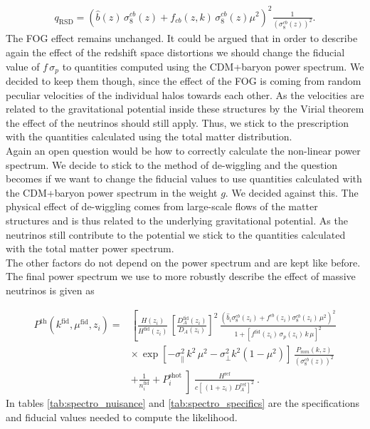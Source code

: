\documentclass[../main.tex]{subfiles}
\begin{document}
\begin{align*}
    q_\mathrm{RSD} = \left(\hat{b}(z) \,\sigma_8^{cb}(z)+f_{cb}(z,k) \,\sigma_8^{cb}(z)\mu^2\right)^2 \frac{1}{\left(\sigma_8^{cb}(z)\right)^2} .
\end{align*} 
The FOG effect remains unchanged. It could be argued that in order to describe again the effect of the redshift space distortions we should change the fiducial value of $f\,\sigma_p$ to quantities computed using the CDM+baryon power spectrum. We decided to keep them though, since the effect of the FOG is coming from random peculiar velocities of the individual halos towards each other. As the velocities are related to the gravitational potential inside these structures by the Virial theorem the effect of the neutrinos should still apply. Thus, we stick to the prescription with the quantities calculated using the total matter distribution.\\
Again an open question would be how to correctly calculate the non-linear power spectrum. We decide to stick to the method of de-wiggling and the question becomes if we want to change the fiducial values to use quantities calculated with the CDM+baryon power spectrum in the weight $g$. We decided against this. The physical effect of de-wiggling comes from large-scale flows of the matter structures and is thus related to the underlying gravitational potential. As the neutrinos still contribute to the potential we stick to the quantities calculated with the total matter power spectrum.\\
The other factors do not depend on the power spectrum and are kept like before. The final power spectrum we use to more robustly describe the effect of massive neutrinos is given as 

\begin{align}
    P^\mathrm{th}(k^\mathrm{fid},\mu^\mathrm{fid},z_i) =& \left[\frac{H(z_i)}{H^\mathrm{fid}(z_i)}\, \left[\frac{D^\mathrm{fid}_A(z_i)}{D_A(z_i)}\right]^2 \, \frac{\left(\hat{b}_i \sigma^{cb}_8(z_i) + f^{cb}(z_i) \sigma^{cb}_8(z_i) \,\mu^2 \right)^2}{1+\left[f^\mathrm{fid}(z_i)\,\sigma_p(z_i)\,k\,\mu\right]^2} \right. \nonumber\\
    &\times\,\exp\left[- \sigma_\|^2 \, k^2\,\mu^2 - \sigma_\perp^2 k^2 \left(1-\mu^2\right) \right]\, \frac{P_{mm}(k,z)}{\left(\sigma_8^{cb}(z)\right)^2}  \\
    &+ \left.\frac{1}{n_i^\mathrm{fid}} + P_i^\mathrm{shot}\middle] \frac{H^\mathrm{ref}}{c\left[ \,(1+z_i)\,D_A^\mathrm{ref}\right]^2}\right.\:.\nonumber
\end{align} 
In tables \ref{tab:spectro_nuisance} and \ref{tab:spectro_specifics} are the specifications and fiducial values needed to compute the likelihood.
\end{document}
